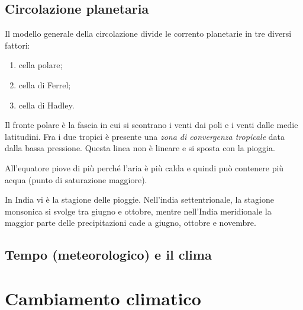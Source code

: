 \documentclass[a4paper]{article}
\begin{document}
\subsection{Circolazione planetaria}

Il modello generale della circolazione divide le corrento planetarie in tre diversi fattori:
\begin{enumerate}
    \item cella polare;
    \item cella di Ferrel;
    \item cella di Hadley.
\end{enumerate}

Il fronte polare è la fascia in cui si scontrano i venti dai poli e i venti dalle medie latitudini.
Fra i due tropici è presente una \textit{zona di convergenza tropicale} data dalla bassa pressione.
Questa linea non è lineare e si sposta con la pioggia.

All'equatore piove di più perché l'aria è più calda e quindi può contenere più acqua (punto di saturazione maggiore). 

In India vi è la stagione delle pioggie. Nell'india settentrionale,
la stagione monsonica si svolge tra giugno e
ottobre, mentre nell'India meridionale la maggior parte
delle precipitazioni cade a giugno, ottobre e novembre.

\subsection{Tempo (meteorologico) e il clima}


\pagebreak

\section{Cambiamento climatico}

\end{document}
